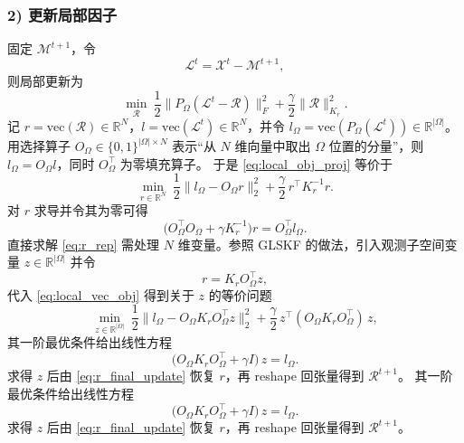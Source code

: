 \documentclass[UTF8]{ctexart}
\begin{document}
\subsubsection*{2) 更新局部因子}
固定 $\mathcal{M}^{t+1}$，令
\[
\mathcal{L}^t=\mathcal{X}^t-\mathcal{M}^{t+1},
\]
则局部更新为
\begin{equation}
\min_{\mathcal{R}}\ \frac12\big\|P_{\Omega}(\mathcal{L}^t-\mathcal{R})\big\|_F^2 + \frac{\gamma}{2}\|\mathcal{R}\|_{K_r}^2 .
\label{eq:local_obj_proj}
\end{equation}
记 $r=\mathrm{vec}(\mathcal{R})\in\mathbb{R}^N$，$l=\mathrm{vec}(\mathcal{L}^t)\in\mathbb{R}^N$，并令 $l_\Omega=\mathrm{vec}(P_\Omega(\mathcal{L}^t))\in\mathbb{R}^{|\Omega|}$。
用选择算子 $O_\Omega\in\{0,1\}^{|\Omega|\times N}$ 表示“从 $N$ 维向量中取出 $\Omega$ 位置的分量”，则 $l_\Omega = O_\Omega l$，同时 $O_\Omega^\top$ 为零填充算子。
于是 \eqref{eq:local_obj_proj} 等价于
\begin{equation}
\min_{r\in\mathbb{R}^N}\ \frac12\|l_\Omega - O_\Omega r\|_2^2 + \frac{\gamma}{2}\, r^\top K_r^{-1} r .
\label{eq:local_vec_obj}
\end{equation}
对 $r$ 求导并令其为零可得
\begin{equation}
\big(O_\Omega^\top O_\Omega + \gamma K_r^{-1}\big)r = O_\Omega^\top l_\Omega .
\label{eq:r_rep}
\end{equation}
直接求解 \eqref{eq:r_rep} 需处理 $N$ 维变量。参照 GLSKF 的做法\cite{lei2024glskf}，引入观测子空间变量 $z\in\mathbb{R}^{|\Omega|}$ 并令
\begin{equation}
r = K_r O_\Omega^\top z ,
\label{eq:r_final_update}
\end{equation}
代入 \eqref{eq:local_vec_obj} 得到关于 $z$ 的等价问题
\begin{equation}
\min_{z\in\mathbb{R}^{|\Omega|}}\ 
\frac12\|l_\Omega - O_\Omega K_r O_\Omega^\top z\|_2^2
+\frac{\gamma}{2}\, z^\top (O_\Omega K_r O_\Omega^\top)\, z ,
\label{eq:local_z_obj}
\end{equation}
其一阶最优条件给出线性方程
\begin{equation}
\big(O_\Omega K_r O_\Omega^\top + \gamma I\big)\, z = l_\Omega .
\label{eq:z_linear_system}
\end{equation}
求得 $z$ 后由 \eqref{eq:r_final_update} 恢复 $r$，再 reshape 回张量得到 $\mathcal{R}^{t+1}$。
其一阶最优条件给出线性方程
\begin{equation}
\big(O_\Omega K_r O_\Omega^\top + \gamma I\big)\, z = l_\Omega .
\label{eq:z_linear_system}
\end{equation}
求得 $z$ 后由 \eqref{eq:r_final_update} 恢复 $r$，再 reshape 回张量得到 $\mathcal{R}^{t+1}$。
\end{document}
